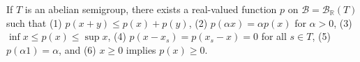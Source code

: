 If $T$ is an abelian semigroup, there exists a real-valued function $p$ on $\mathcal{B} = \mathcal{B}_{\mathbb{R}}(T)$ such that (1) $p(x + y) \leq p(x) + p(y)$, (2) $p(\alpha x) = \alpha p(x)$ for $\alpha > 0$, (3) $\inf x \leq p(x) \leq \sup x$, (4) $p(x - x_s) = p(x_s - x) = 0$ for all $s \in T$, (5) $p(\alpha 1) = \alpha$, and (6) $x \geq 0$ implies $p(x) \geq 0$.